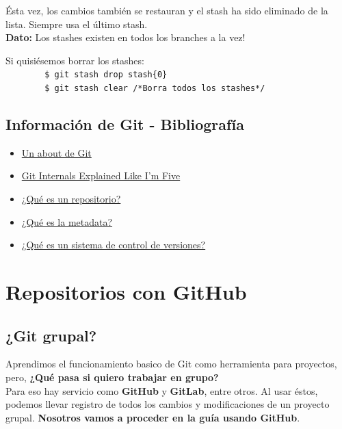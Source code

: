 \documentclass[a4paper, 12pt]{article}
\begin{document}
Ésta vez, los cambios también se restauran y el stash ha sido eliminado de la lista. Siempre usa el último stash.\\

\textbf{Dato:} Los stashes existen en todos los branches a la vez!

Si quisiésemos borrar los stashes:\\

\verb+        $ git stash drop stash{0}+\\
\verb+        $ git stash clear /*Borra todos los stashes*/+

\subsection{Información de Git - Bibliografía}

\begin{itemize}

\item \href{https://git-scm.com/about}{Un about de Git}
\item \href{https://dev.to/sublimegeek/git-staging-area-explained-like-im-five-1anh}{Git Internals Explained Like I'm Five}
\item \href{https://en.wikipedia.org/wiki/Repository_(version_control)}{¿Qué es un repositorio?}
\item \href{https://en.wikipedia.org/wiki/Metadata}{¿Qué es la metadata?}
\item \href{https://en.wikipedia.org/wiki/Version_control}{¿Qué es un sistema de control de versiones?}

\end{itemize}

\newpage
\section{Repositorios con GitHub}

\subsection{¿Git grupal?}

Aprendimos el funcionamiento basico de Git como herramienta para proyectos, pero, \textbf{¿Qué pasa si quiero trabajar en grupo?}\\

Para eso hay servicio como \textbf{GitHub} y \textbf{GitLab}, entre otros. Al usar éstos, podemos llevar registro de todos los cambios y modificaciones de un proyecto grupal. \textbf{Nosotros vamos a proceder en la guía usando GitHub}.
\end{document}
